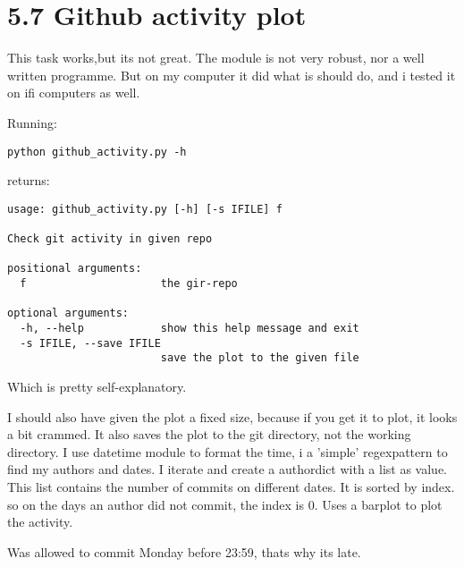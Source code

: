 \documentclass[a4paper]{article}
\begin{document}
\section*{5.7 Github activity plot}
This task works,but its not great. The module is not very robust, nor a well written programme. But on my computer it did what is should do, and i tested it on ifi computers as well.

Running:
\begin{verbatim}
python github_activity.py -h
\end{verbatim}
returns:
\begin{verbatim}
usage: github_activity.py [-h] [-s IFILE] f

Check git activity in given repo

positional arguments:
  f                     the gir-repo

optional arguments:
  -h, --help            show this help message and exit
  -s IFILE, --save IFILE
                        save the plot to the given file

\end{verbatim}
Which is pretty self-explanatory.

I should also have given the plot a fixed size, because if you get it to plot, it looks a bit crammed. It also saves the plot to the git directory, not the working directory. I use datetime module to format the time, i a 'simple' regexpattern to find my authors and dates. I iterate and create a authordict with a list as value. This list contains the number of commits on different dates. It is sorted by index. so on the days an author did not commit, the index is 0. 
Uses a barplot to plot the activity.

Was allowed to commit Monday before 23:59, thats why its late. 




\end{document}
